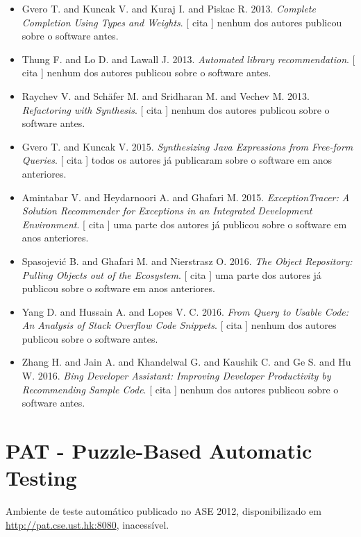 \begin{itemize}
\item Gvero T. and Kuncak V. and Kuraj I. and Piskac R.
      2013.
        \textit{ Complete Completion Using Types and Weights}.
      [
          cita
      ]
nenhum dos autores publicou sobre o software antes.
\item Thung F. and Lo D. and Lawall J.
      2013.
        \textit{ Automated library recommendation}.
      [
          cita
      ]
nenhum dos autores publicou sobre o software antes.
\item Raychev V. and Sch\"{a}fer M. and Sridharan M. and Vechev M.
      2013.
        \textit{ Refactoring with Synthesis}.
      [
          cita
      ]
nenhum dos autores publicou sobre o software antes.
\item Gvero T. and Kuncak V.
      2015.
        \textit{ Synthesizing Java Expressions from Free-form Queries}.
      [
          cita
      ]
todos os autores já publicaram sobre o software em anos anteriores.
\item Amintabar V. and Heydarnoori A. and Ghafari M.
      2015.
        \textit{ ExceptionTracer: A Solution Recommender for Exceptions in an Integrated Development Environment}.
      [
          cita
      ]
uma parte dos autores já publicou sobre o software em anos anteriores.
\item Spasojevi\'{c} B. and Ghafari M. and Nierstrasz O.
      2016.
        \textit{ The Object Repository: Pulling Objects out of the Ecosystem}.
      [
          cita
      ]
uma parte dos autores já publicou sobre o software em anos anteriores.
\item Yang D. and Hussain A. and Lopes V. C.
      2016.
        \textit{ From Query to Usable Code: An Analysis of Stack Overflow Code Snippets}.
      [
          cita
      ]
nenhum dos autores publicou sobre o software antes.
\item Zhang H. and Jain A. and Khandelwal G. and Kaushik C. and Ge S. and Hu W.
      2016.
        \textit{ Bing Developer Assistant: Improving Developer Productivity by Recommending Sample Code}.
      [
          cita
      ]
nenhum dos autores publicou sobre o software antes.
\end{itemize}
\section{PAT - Puzzle-Based Automatic Testing}

Ambiente de teste automático
publicado no ASE 2012,
disponibilizado em \url{http://pat.cse.ust.hk:8080},
inacessível.

